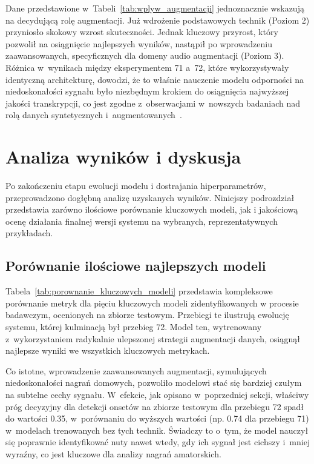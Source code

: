 Dane przedstawione w~Tabeli~\ref{tab:wplyw_augmentacji} jednoznacznie wskazują na decydującą rolę augmentacji. Już wdrożenie podstawowych technik (Poziom 2) przyniosło skokowy wzrost skuteczności. Jednak kluczowy przyrost, który pozwolił na osiągnięcie najlepszych wyników, nastąpił po wprowadzeniu zaawansowanych, specyficznych dla domeny audio augmentacji (Poziom 3). Różnica w~wynikach między eksperymentem 71 a~72, które wykorzystywały identyczną architekturę, dowodzi, że to właśnie nauczenie modelu odporności na niedoskonałości sygnału było niezbędnym krokiem do osiągnięcia najwyższej jakości transkrypcji, co jest zgodne z~obserwacjami w~nowszych badaniach nad rolą danych syntetycznych i~augmentowanych~\autocite{Zang2023SynthTab}.



\section{Analiza wyników i dyskusja}
\label{ssec:analiza_wynikow}

Po zakończeniu etapu ewolucji modelu i dostrajania hiperparametrów, przeprowadzono dogłębną analizę uzyskanych wyników. Niniejszy podrozdział przedstawia zarówno ilościowe porównanie kluczowych modeli, jak i jakościową ocenę działania finalnej wersji systemu na wybranych, reprezentatywnych przykładach.

\subsection{Porównanie ilościowe najlepszych modeli}
\label{sssec:porownanie_ilosciowe}

Tabela~\ref{tab:porownanie_kluczowych_modeli} przedstawia kompleksowe porównanie metryk dla pięciu kluczowych modeli zidentyfikowanych w procesie badawczym, ocenionych na zbiorze testowym. Przebiegi te ilustrują ewolucję systemu, której kulminacją był przebieg 72. Model ten, wytrenowany z~wykorzystaniem radykalnie ulepszonej strategii augmentacji danych, osiągnął najlepsze wyniki we wszystkich kluczowych metrykach.

Co istotne, wprowadzenie zaawansowanych augmentacji, symulujących niedoskonałości nagrań domowych, pozwoliło modelowi stać się bardziej czułym na subtelne cechy sygnału. W~efekcie, jak opisano w~poprzedniej sekcji, właściwy próg decyzyjny dla detekcji onsetów na zbiorze testowym dla przebiegu 72 spadł do wartości 0.35, w~porównaniu do wyższych wartości (np. 0.74 dla przebiegu 71) w~modelach trenowanych bez tych technik. Świadczy to o~tym, że model nauczył się poprawnie identyfikować nuty nawet wtedy, gdy ich sygnał jest cichszy i~mniej wyraźny, co jest kluczowe dla analizy nagrań amatorskich.

